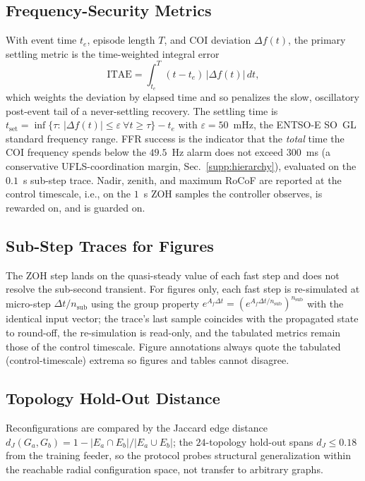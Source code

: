 \documentclass[lettersize,journal]{IEEEtran}
\begin{document}
\subsection{Frequency-Security Metrics}
With event time $t_e$, episode length $T$, and COI deviation $\Delta f(t)$, the primary settling metric is the time-weighted integral error
\begin{equation}
  \mathrm{ITAE}=\int_{t_e}^{T}(t-t_e)\,|\Delta f(t)|\,dt,
\end{equation}
which weights the deviation by elapsed time and so penalizes the slow, oscillatory post-event tail of a never-settling recovery. The settling time is
$t_{\mathrm{set}}=\inf\{\tau:\,|\Delta f(t)|\le\varepsilon\ \forall t\ge\tau\}-t_e$ with $\varepsilon=50$~mHz, the ENTSO-E SO~GL standard frequency range. FFR success is the indicator that the \emph{total} time the COI frequency spends below the $49.5$~Hz alarm does not exceed $300$~ms (a conservative UFLS-coordination margin, Sec.~\ref{supp:hierarchy}), evaluated on the $0.1$~s sub-step trace. Nadir, zenith, and maximum RoCoF are reported at the control timescale, i.e., on the $1$~s ZOH samples the controller observes, is rewarded on, and is guarded on.

\subsection{Sub-Step Traces for Figures}
The ZOH step lands on the quasi-steady value of each fast step and does not resolve the sub-second transient. For figures only, each fast step is re-simulated at micro-step $\Delta t/n_{\mathrm{sub}}$ using the group property $e^{A_f\Delta t}=(e^{A_f\Delta t/n_{\mathrm{sub}}})^{n_{\mathrm{sub}}}$ with the identical input vector; the trace's last sample coincides with the propagated state to round-off, the re-simulation is read-only, and the tabulated metrics remain those of the control timescale. Figure annotations always quote the tabulated (control-timescale) extrema so figures and tables cannot disagree.

\subsection{Topology Hold-Out Distance}
Reconfigurations are compared by the Jaccard edge distance
$d_J(G_a,G_b)=1-|E_a\cap E_b|/|E_a\cup E_b|$;
the $24$-topology hold-out spans $d_J\le0.18$ from the training feeder, so the protocol probes structural generalization within the reachable radial configuration space, not transfer to arbitrary graphs.
\end{document}
